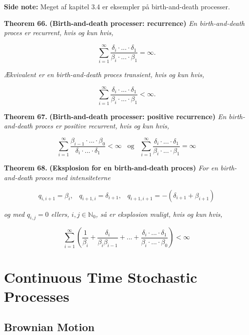 \documentclass[
]{book}
\begin{document}
\textbf{Side note:} Meget af kapitel 3.4 er eksempler på birth-and-death processer.

\textbf{Theorem 66.} \textbf{(Birth-and-death processer: recurrence)} \emph{En birth-and-death proces er recurrent, hvis og kun hvis,}

\[
\sum_{i=1}^\infty\frac{\delta_i\cdot...\cdot \delta_1}{\beta_i\cdot...\cdot \beta_1} = \infty.
\]

\emph{Ækvivalent er en birth-and-death proces transient, hvis og kun hvis,}

\[
\sum_{i=1}^\infty\frac{\delta_i\cdot...\cdot \delta_1}{\beta_i\cdot...\cdot \beta_1} < \infty.
\]

\textbf{Theorem 67.} \textbf{(Birth-and-death processer: positive recurrence)} \emph{En birth-and-death proces er positive recurrent, hvis og kun hvis,}

\[
\sum_{i=1}^\infty\frac{\beta_{i-1}\cdot...\cdot \beta_0}{\delta_i\cdot...\cdot \delta_1} < \infty \hspace{10pt} \text{og} \hspace{10pt} \sum_{i=1}^\infty\frac{\delta_i\cdot...\cdot \delta_1}{\beta_i\cdot...\cdot \beta_1} = \infty
\]

\textbf{Theorem 68.} \textbf{(Eksplosion for en birth-and-death proces)} \emph{For en birth-and-death proces med intensiteterne}

\[
q_{i,i+1} = \beta_i, \hspace{10pt} q_{i+1,i}=\delta_{i+1}, \hspace{10pt} q_{i+1,i+1} = -(\delta_{i+1}+\beta_{i+1})
\]

\emph{og med \(q_{i,j} = 0\) ellers, \(i,j \in \mathbb{N}_0\), så er eksplosion muligt, hvis og kun hvis,}

\[
\sum_{i=1}^\infty\left(\frac{1}{\beta_i}+\frac{\delta_i}{\beta_i\beta_{i-1}}+...+\frac{\delta_i\cdot...\cdot \delta_1}{\beta_i\cdot...\cdot \beta_0}\right)<\infty
\]

\hypertarget{continuous-time-stochastic-processes}{%
\chapter{Continuous Time Stochastic Processes}\label{continuous-time-stochastic-processes}}

\hypertarget{brownian-motion}{%
\section{Brownian Motion}\label{brownian-motion}}
\end{document}
